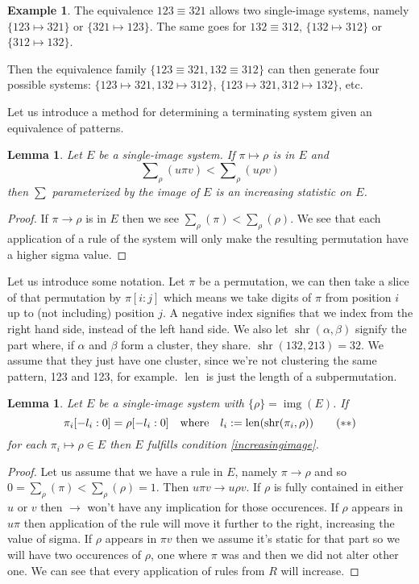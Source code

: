 \documentclass[a4paper, 11pt]{article}
\newtheorem{lemma}[theorem]{Lemma}
\theoremstyle{definition}
\newtheorem{example}[theorem]{Example}
\DeclareMathOperator{\img}{img}
\DeclareMathOperator{\len}{len}
\DeclareMathOperator{\shr}{shr}
\begin{document}
\begin{example}
    The equivalence $123 \equiv 321$ allows two single-image systems, namely
    $\{123 \mapsto 321\}$ or $\{321 \mapsto 123\}$. The same goes for $132 \equiv 312$,
    $\{132 \mapsto 312\}$ or $\{312 \mapsto 132\}$.

    Then the equivalence family $\{123 \equiv 321, 132 \equiv 312\}$ can then generate
    four possible systems: $\{123 \mapsto 321, 132 \mapsto 312\}$, $\{123 \mapsto 321,
    312 \mapsto 132\}$, etc.
\end{example}

Let us introduce a method for determining a terminating system given an
equivalence of patterns.

\begin{lemma}
    Let $E$ be a single-image system. If $\pi \mapsto \rho$ is in $E$ and 
    \[
        \sum\nolimits_\rho(u\pi v) < \sum\nolimits_\rho(u \rho v) \tag{$\ast$}
        \label{increasingimage}
    \]
    then $\sum$ parameterized by the image of $E$ is an increasing statistic on
    $E$.
\end{lemma}
\begin{proof}
    If $\pi \to \rho$ is in $E$ then we see $\sum_\rho(\pi) <
    \sum_\rho(\rho)$.  We see that each application of a rule of the system
    will only make the resulting permutation have a higher sigma value.
\end{proof}

Let us introduce some notation. Let $\pi$ be a permutation, we can then take a
slice of that permutation by $\pi[i:j]$ which means we take digits of $\pi$ from
position $i$ up to (not including) position $j$. A negative index signifies that
we index from the right hand side, instead of the left hand side. We also let $\shr(\alpha,
\beta)$ signify the part where, if $\alpha$ and $\beta$ form a cluster, they
share. $\shr(132, 213) = 32$. We assume that they just have one cluster, since
we're not clustering the same pattern, 123 and 123, for example. $\len$ is just
the length of a subpermutation.

\begin{lemma}
    Let $E$ be a single-image system with $\{\rho\} = \img(E)$. If
    \[
        \pi_i[-l_i:0] = \rho[-l_i:0] \quad \textnormal{where} \quad l_i :=
        \len(\shr(\pi_i, \rho)) \tag{$\ast\ast$} \label{joininvariance}
    \]
    for each $\pi_i \mapsto \rho \in E$ then $E$ fulfills condition
    \eqref{increasingimage}. \end{lemma}
\begin{proof}
    Let us assume that we have a rule in $E$, namely $\pi \to \rho$ and so
    $0 = \sum_\rho(\pi) < \sum_\rho(\rho) = 1$. Then $u \pi v \to u \rho v$. 
    If $\rho$ is fully contained in either $u$ or $v$ then $\to$ won't have any
    implication for those occurences. If $\rho$ appears in $u\pi$ then
    application of the rule will move it further to the right, increasing the
    value of sigma. If $\rho$ appears in $\pi v$ then we assume it's static for
    that part so we will have two occurences of $\rho$, one where $\pi$ was and
    then we did not alter other one.
    We can see that every application of rules from $R$ will increase.
\end{proof}
\end{document}
